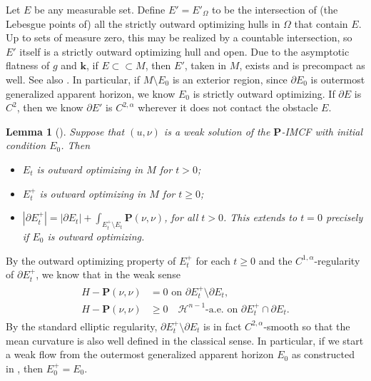 \documentclass[11pt,letterpaper]{amsart}
\newtheorem{lem}[thm]{Lemma}
\theoremstyle{definition}
\theoremstyle{remark}
\newcommand{\Pten}{\mathbf P}
\newcommand{\kten}{\mathbf k}
\begin{document}
Let $E$ be any measurable set. Define $E' = E'_{\Omega }$ to be the intersection of (the Lebesgue points of) all the strictly outward optimizing hulls in $\Omega $ that contain $E$. Up to sets of measure zero, this may be realized by a countable intersection, so $E'$ itself is a strictly outward optimizing hull and open. Due to the asymptotic flatness of $g$ and $\kten$, if $E \subset \subset M$, then $E'$, taken in $M$, exists and is precompact as well. See also \cite{Eichmair10}. In particular, if $M \setminus E_0$ is an exterior region, since $\partial E_0$ is outermost generalized apparent horizon, we know $E_0$ is strictly outward optimizing.
If $\partial E$ is $C^2$, then we know $\partial E'$ is $C^{2,\alpha }$ wherever it does not contact the obstacle $E$. 

\begin{lem}[{\cite[Lemma 5.2]{Dong26SigmaIMCF}}]\label{lem-optimizing-property}
	Suppose that $(u, \nu )$ is a weak solution of the $\Pten$-IMCF with initial condition $E_0$. Then
	\begin{itemize}
		\item [(i)] $E_t$ is outward optimizing in $M$ for $t>0$;
		\item [(ii)] $E_t ^{+}$ is outward optimizing in $M$ for $t \geq 0$;
		\item [(iii)] $|\partial E_t ^{+}| = |\partial E_t| + \int_{E_t ^{+}\setminus E_t}\Pten(\nu ,\nu )$, for all $t>0$. This extends to $t=0$ precisely if $E_0$ is outward optimizing.
	\end{itemize}
\end{lem}

By the outward optimizing property of $E_{t}^{+}$ for each $t \geq 0$ and the $C^{1,\alpha }$-regularity of $\partial E ^{+}_{t}$, we know that in the weak sense
\begin{align}\label{mean-curv-hull}
	\begin{split}
		H - \Pten(\nu ,\nu ) &= 0 \text{ on } \partial E_{t} ^{+} \setminus \partial E_{t},\\
		H - \Pten(\nu ,\nu ) & \geq 0 \quad \mathcal{H}^{n-1}\text{-a.e. on } \partial E_{t}^{+} \cap \partial E_{t}.
	\end{split}
\end{align}
By the standard elliptic regularity, $\partial E_{t}^{+} \setminus \partial E_{t}$ is in fact $C^{2,\alpha }$-smooth so that the mean curvature is also well defined in the classical sense. In particular, if we start a weak flow from the outermost generalized apparent horizon $E_0$ as constructed in \cite{Eichmair10}, then $E_{0} ^{+} = E_0$.
\end{document}
